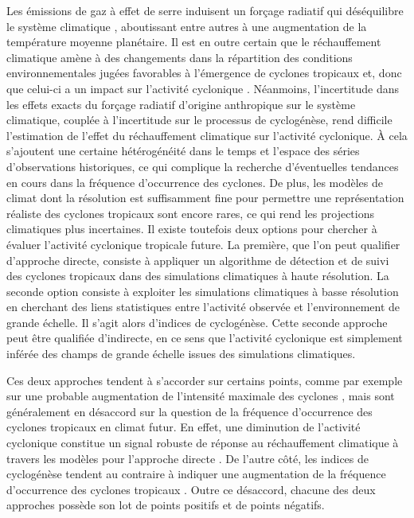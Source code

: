 \documentclass[../main.tex]{subfiles}
\begin{document}
Les émissions de gaz à effet de serre induisent un forçage radiatif qui déséquilibre le système climatique \parencite{charney_carbon_1979}, aboutissant entre
autres à une augmentation de la température moyenne planétaire. Il est en outre certain que le réchauffement climatique amène à des changements dans la
répartition des conditions environnementales jugées favorables à l'émergence de cyclones tropicaux et, donc que celui-ci a un impact sur l'activité cyclonique
\parencite{seneviratne_weather_2021}. Néanmoins, l'incertitude dans les effets exacts du forçage radiatif d'origine anthropique sur le système climatique,
couplée à l'incertitude sur le processus de cyclogénèse, rend difficile l'estimation de l'effet du réchauffement climatique sur l'activité cyclonique. À cela
s'ajoutent une certaine hétérogénéité dans le temps et l'espace des séries d'observations historiques, ce qui complique la recherche d'éventuelles tendances en
cours dans la fréquence d'occurrence des cyclones. De plus, les modèles de climat dont la résolution est suffisamment fine pour permettre une représentation
réaliste des cyclones tropicaux sont encore rares, ce qui rend les projections climatiques plus incertaines. Il existe toutefois deux options pour chercher à
évaluer l'activité cyclonique tropicale future. La première, que l'on peut qualifier d'approche directe, consiste à appliquer un algorithme de détection et de
suivi des cyclones tropicaux dans des simulations climatiques à haute résolution. La seconde option consiste à exploiter les simulations climatiques à basse
résolution en cherchant des liens statistiques entre l'activité observée et l'environnement de grande échelle. Il s'agit alors d'indices de cyclogénèse. Cette
seconde approche peut être qualifiée d'indirecte, en ce sens que l'activité cyclonique est simplement inférée des champs de grande échelle issues des
simulations climatiques.

Ces deux approches tendent à s'accorder sur certains points, comme par exemple sur une probable augmentation de l'intensité maximale des cyclones
\parencite{sobel_human_2016,bhatia_projected_2018}, mais sont généralement en désaccord sur la question de la fréquence d'occurrence des cyclones tropicaux en
climat futur. En effet, une diminution de l'activité cyclonique constitue un signal robuste de réponse au réchauffement climatique à travers les modèles pour
l'approche directe \parencite{christensen_climate_2013,knutson_tropical_2020}. De l'autre côté, les indices de cyclogénèse tendent au contraire à indiquer une
augmentation de la fréquence d'occurrence des cyclones tropicaux \parencite{emanuel_downscaling_2013,camargo_testing_2014}. Outre ce désaccord, chacune des deux
approches possède son lot de points positifs et de points négatifs.
\end{document}
